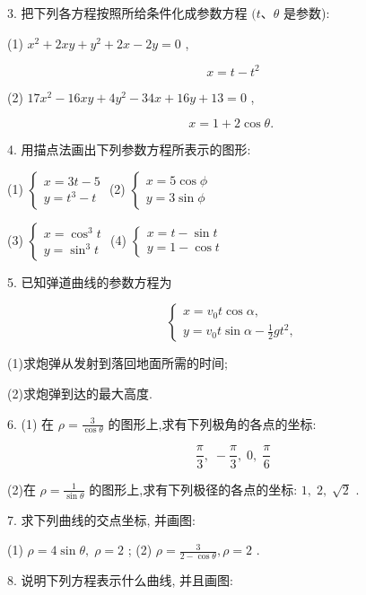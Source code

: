 \documentclass[lang=cn,newtx,10.5pt,scheme=chinese]{elegantbook}
\begin{document}
3. 把下列各方程按照所给条件化成参数方程 \((t\text{、}\theta\) 是参数):

(1) \({x}^{2} + {2xy} + {y}^{2} + {2x} - {2y} = 0\) ,

\[
  x = t - {t}^{2}
\]

(2) \({17}{x}^{2} - {16xy} + 4{y}^{2} - {34x} + {16y} + {13} = 0\) ,

\[
  x = 1 + 2\cos \theta \text{. }
\]

4. 用描点法画出下列参数方程所表示的图形:

(1) \(\left\{ \begin{array}{l} x = {3t} - 5 \\ y = {t}^{3} - t \end{array}\right.\) (2) \(\left\{ \begin{array}{l} x = 5\cos \phi \\ y = 3\sin \phi \end{array}\right.\)

(3) \(\left\{ \begin{array}{l} x = {\cos }^{3}t \\ y = {\sin }^{3}t \end{array}\right.\) (4) \(\left\{ \begin{array}{l} x = t - \sin t \\ y = 1 - \cos t \end{array}\right.\)

5. 已知弹道曲线的参数方程为

\[
  \left\{ \begin{array}{l} x = {v}_{0}t\cos \alpha , \\ y = {v}_{0}t\sin \alpha - \frac{1}{2}g{t}^{2}, \end{array}\right.
\]

(1)求炮弹从发射到落回地面所需的时间;

(2)求炮弹到达的最大高度.

6. (1) 在 \(\rho = \frac{3}{\cos \theta }\) 的图形上,求有下列极角的各点的坐标:

\[
  \frac{\pi }{3},\; - \frac{\pi }{3},\;0,\;\frac{\pi }{6}
\]

(2)在 \(\rho = \frac{1}{\sin \theta }\) 的图形上,求有下列极径的各点的坐标: \(1,\;2,\;\sqrt{2}\) .

7. 求下列曲线的交点坐标, 并画图:

(1) \(\rho = 4\sin \theta ,\;\rho = 2\) ; (2) \(\rho = \frac{3}{2 - \cos \theta },\rho = 2\) .

8. 说明下列方程表示什么曲线, 并且画图:
\end{document}
